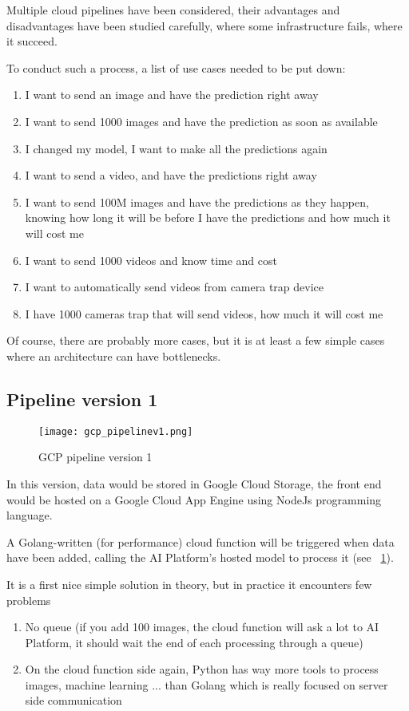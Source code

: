 \pagebreak
Multiple cloud pipelines have been considered, their advantages and disadvantages have been studied carefully, where some infrastructure fails, where it succeed.

To conduct such a process, a list of use cases needed to be put down:

\begin{enumerate}
    \item I want to send an image and have the prediction right away
    \item I want to send 1000 images and have the prediction as soon as available
    \item I changed my model, I want to make all the predictions again
    \item I want to send a video, and have the predictions right away
    \item I want to send 100M images and have the predictions as they happen, knowing how long it will be before I have the predictions and how much it will cost me
    \item I want to send 1000 videos and know time and cost
    \item I want to automatically send videos from camera trap device
    \item I have 1000 cameras trap that will send videos, how much it will cost me
\end{enumerate}

Of course, there are probably more cases, but it is at least a few simple cases where an architecture can have bottlenecks.


\pagebreak\subsection{Pipeline version 1}

\begin{figure}[H]
    \centering
    \texttt{[image: gcp\_pipelinev1.png]}
	\caption{GCP pipeline version 1}
	\label{fig:pipelinev1}
\end{figure}

In this version, data would be stored in Google Cloud Storage, the front end would be hosted on a Google Cloud App Engine using NodeJs programming language.

A Golang-written (for performance) cloud function will be triggered when data have been added, calling the AI Platform's hosted model to process it (see ~\ref{fig:pipelinev1}).

\pagebreak
It is a first nice simple solution in theory, but in practice it encounters few problems
\begin{enumerate}
    \item No queue (if you add 100 images, the cloud function will ask a lot to AI Platform, it should wait the end of each processing through a queue)
    \item On the cloud function side again, Python has way more tools to process images, machine learning ... than Golang which is really focused on server side communication
\end{enumerate}

